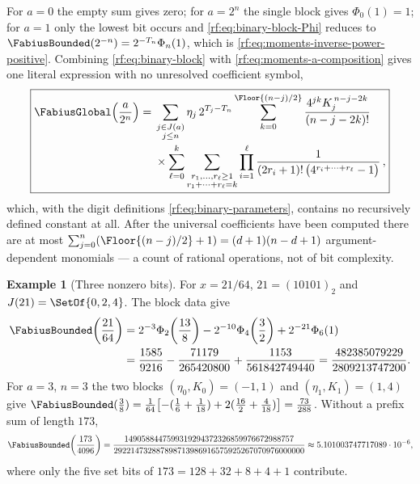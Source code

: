 \documentclass[11pt,oneside]{article}
\theoremstyle{plain}
\theoremstyle{definition}
\newtheorem{example}[theorem]{Example}
\theoremstyle{remark}
\newcommand{\Fb}{\FabiusBounded}            %
\newcommand{\Fg}{\FabiusGlobal}             %
\newcommand{\Tr}[1]{T_{#1}}                 %
\begin{document}
For $a=0$ the empty sum gives zero; for $a=2^{n}$ the single block gives
$\Phi_{0}(1)=1$; for $a=1$ only the lowest bit occurs and
\cref{rf:eq:binary-block-Phi} reduces to $\Fb(2^{-n})=2^{-\Tr{n}}\Phi_{n}(1)$,
which is \cref{rf:eq:moments-inverse-power-positive}.  Combining
\cref{rf:eq:binary-block} with \cref{rf:eq:moments-a-composition} gives one
literal expression with no unresolved coefficient symbol,
\begin{equation}
 \boxed{\begin{aligned}
 \Fg\!\left(\frac{a}{2^{n}}\right)
 ={}&\sum_{\substack{j\in J(a)\\ j\le n}}\eta_{j}\,2^{\Tr{j}-\Tr{n}}
   \sum_{k=0}^{\Floor{(n-j)/2}}\frac{4^{jk}K_{j}^{\,n-j-2k}}{(n-j-2k)!}\\[-0.1em]
 &\times\sum_{\ell=0}^{k}\sum_{\substack{r_{1},\ldots,r_{\ell}\ge1\\ r_{1}+\cdots+r_{\ell}=k}}
   \prod_{i=1}^{\ell}\frac{1}{(2r_{i}+1)!\,\bigl(4^{r_{i}+\cdots+r_{\ell}}-1\bigr)}\,,
 \end{aligned}}
 \label{rf:eq:binary-fully-expanded}
\end{equation}
which, with the digit definitions \cref{rf:eq:binary-parameters}, contains
no recursively defined constant at all.  After the universal coefficients
have been computed there are at most $\sum_{j=0}^{n}(\Floor{(n-j)/2}+1)
=(d+1)(n-d+1)$ argument-dependent monomials --- a count of rational
operations, not of bit complexity.

\begin{example}[Three nonzero bits]
\label{rf:ex:binary-21}
For $x=21/64$, $21=(10101)_{2}$ and $J(21)=\SetOf{0,2,4}$.  The block data
give
\begin{align*}
 \Fb\!\left(\frac{21}{64}\right)
 &=2^{-3}\Phi_{2}\!\left(\frac{13}{8}\right)
 -2^{-10}\Phi_{4}\!\left(\frac{3}{2}\right)
 +2^{-21}\Phi_{6}(1)\\
 &=\frac{1585}{9216}-\frac{71179}{265420800}+\frac{1153}{561842749440}
 =\frac{482385079229}{2809213747200}.
\end{align*}
For $a=3$, $n=3$ the two blocks $(\eta_{0},K_{0})=(-1,1)$ and
$(\eta_{1},K_{1})=(1,4)$ give
$\Fb(\tfrac38)=\tfrac1{64}\bigl[-(\tfrac16+\tfrac1{18})+2(\tfrac{16}{2}+\tfrac4{18})\bigr]
=\tfrac{73}{288}$.  Without a prefix sum of length $173$,
\begin{equation}
 \Fb\!\left(\frac{173}{4096}\right)
 =\frac{1490588447599319294372326859976672988757}
       {292214732887898713986916575925267070976000000}
 \approx5.101003747717089\cdot10^{-6},
 \label{rf:eq:binary-large}
\end{equation}
where only the five set bits of $173=128+32+8+4+1$ contribute.
\end{example}
\end{document}
